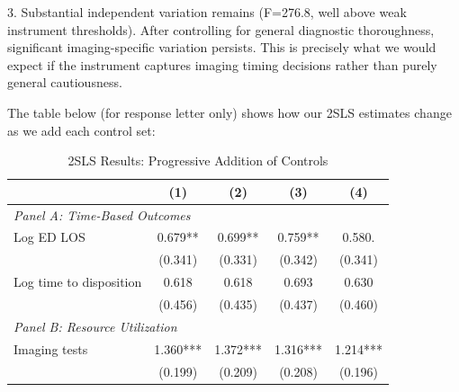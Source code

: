 \documentclass[11pt]{article}
\newcommand{\1}{\hbox{\rm 1\kern-.35em 1}}
\begin{document}
{3. Substantial independent variation remains (F=276.8, well above weak instrument thresholds). After controlling for general diagnostic thoroughness, significant imaging-specific variation persists. This is precisely what we would expect if the instrument captures imaging timing decisions rather than purely general cautiousness.

The table below (for response letter only) shows how our 2SLS estimates change as we add each control set:

\begin{table}[h]
\centering
\caption*{2SLS Results: Progressive Addition of Controls}
\begin{threeparttable}
\small
\begin{tabular}{lcccc}
\toprule
& (1) & (2) & (3) & (4) \\
\midrule
\multicolumn{4}{l}{\textit{Panel A: Time-Based Outcomes}} \\[0.5em]
Log ED LOS & 0.679** & 0.699** & 0.759**  & 0.580. \\
& (0.341) & (0.331) & (0.342)  & (0.341) \\[0.5em]
Log time to disposition & 0.618 & 0.618 & 0.693 & 0.630 \\
& (0.456) & (0.435) & (0.437)  & (0.460) \\[0.5em]

\multicolumn{4}{l}{\textit{Panel B: Resource Utilization}} \\[0.5em]
Imaging tests & 1.360*** & 1.372*** & 1.316***  & 1.214*** \\
& (0.199) & (0.209) & (0.208) & (0.196) \\[0.5em]


\end{tabular}
\end{threeparttable}
\end{table}}
\end{document}
